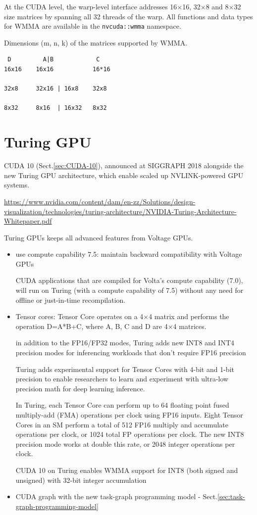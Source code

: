 At the CUDA level, the warp-level interface addresses 16×16, 32×8 and 8×32 size
matrices by spanning all 32 threads of the warp. All functions and data types
for WMMA are available in the \verb!nvcuda::wmma! namespace.

 Dimensions (m, n, k) of the matrices supported by WMMA.
\begin{verbatim}
 D         A|B            C
16x16    16x16           16*16

32x8     32x16 | 16x8    32x8

8x32     8x16  | 16x32   8x32
\end{verbatim}


\chapter{Turing GPU}
\label{sec:GPU-Turing}

CUDA 10 (Sect.\ref{sec:CUDA-10}), announced at SIGGRAPH 2018 alongside the new
Turing GPU architecture, which enable scaled up NVLINK-powered GPU systems.

\url{https://www.nvidia.com/content/dam/en-zz/Solutions/design-visualization/technologies/turing-architecture/NVIDIA-Turing-Architecture-Whitepaper.pdf}

Turing GPUs keeps all advanced features from Voltage GPUs.
\begin{itemize}
  \item use compute capability 7.5: maintain backward compatibility with Voltage GPUs
  
 CUDA applications that are compiled for Volta’s compute capability (7.0), will
 run on Turing (with a compute capability of 7.5) without any need for offline
 or just-in-time recompilation.
  
  \item Tensor cores:  Tensor Core operates on a 4×4 matrix and performs the
  operation D=A*B+C, where A, B, C and D are 4×4 matrices.
  
  in addition to the FP16/FP32 modes, Turing adds new INT8 and INT4 precision
  modes for inferencing workloads that don’t require FP16 precision
  
Turing adds experimental support for Tensor Cores with 4-bit and 1-bit precision
to enable researchers to learn and experiment with ultra-low precision math for
deep learning inference.

In Turing, each Tensor Core can perform up to 64 floating point fused
multiply-add (FMA) operations per clock using FP16 inputs.
Eight Tensor Cores in an SM perform a total of 512 FP16 multiply and accumulate
operations per clock, or 1024 total FP operations per clock. The new INT8
precision mode works at double this rate, or 2048 integer operations per clock.

CUDA 10 on Turing enables WMMA support for INT8 (both signed and unsigned) with
32-bit integer accumulation

  \item CUDA graph with the new task-graph programming model - Sect.\ref{sec:task-graph-programming-model}
\end{itemize}


